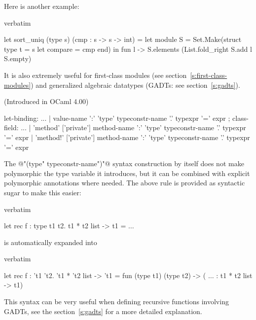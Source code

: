 Here is another example:
\begin{camlexample}{verbatim}
\begin{caml}
\begin{camlinput}
let sort_uniq (type s) (cmp : s -> s -> int) =
  let module S = Set.Make(struct type t = s let compare = cmp end) in
  fun l ->
    S.elements (List.fold_right S.add l S.empty)
\end{camlinput}
\end{caml}
\end{camlexample}

It is also extremely useful for first-class modules (see
section~\ref{s:first-class-modules}) and generalized algebraic datatypes
(GADTs: see section~\ref{s:gadts}).

 (Introduced in OCaml 4.00)

\begin{syntax}
let-binding:
       ...
     | value-name ':' 'type' {{ typeconstr-name }} '.' typexpr '=' expr
;
class-field:
          ...
        | 'method' ['private'] method-name ':' 'type'
          {{ typeconstr-name }} '.' typexpr '=' expr
        | 'method!' ['private'] method-name ':' 'type'
          {{ typeconstr-name }} '.' typexpr '=' expr
\end{syntax}

The @"(type" typeconstr-name")"@ syntax construction by itself does not make
polymorphic the type variable it introduces, but it can be combined
with explicit polymorphic annotations where needed.
The above rule is provided as syntactic sugar to make this easier:
\begin{camlexample}{verbatim}
\begin{caml}
\begin{camlinput}
let rec f : type t1 t2. t1 * t2 list -> t1 = $\ldots$
\end{camlinput}
\end{caml}
\end{camlexample}
\noindent
is automatically expanded into
\begin{camlexample}{verbatim}
\begin{caml}
\begin{camlinput}
let rec f : 't1 't2. 't1 * 't2 list -> 't1 =
  fun (type t1) (type t2) -> ( $\ldots$ : t1 * t2 list -> t1)
\end{camlinput}
\end{caml}
\end{camlexample}
This syntax can be very useful when defining recursive functions involving
GADTs, see the section~\ref{s:gadts} for a more detailed explanation.

